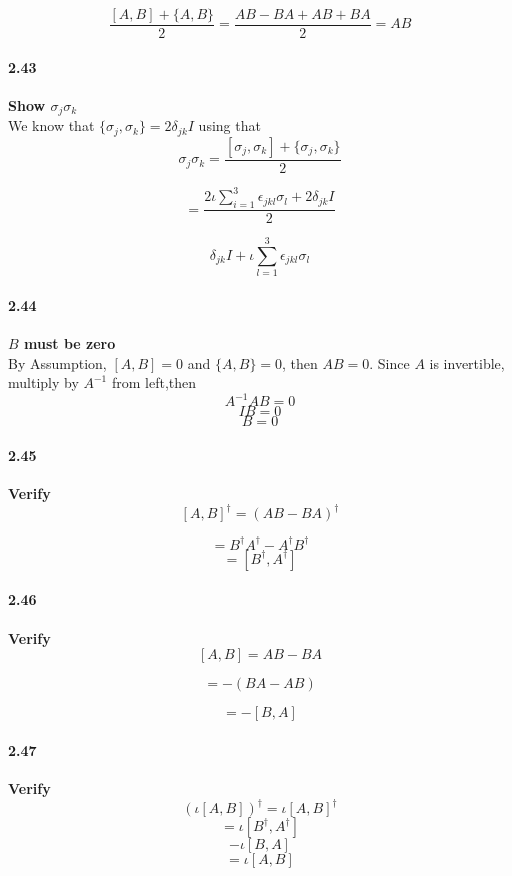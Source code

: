 $$\frac{[A,B] + \{A,B\}}{2} = \frac{AB - BA + AB + BA}{2} = AB$$



 \paragraph{2.43} \textbf{Show $\sigma_j \sigma_k$} \\%

We know that $\{\sigma_j, \sigma_k\} = 2 \delta_{jk}I$
using that
$$ \sigma_j \sigma_k  = \frac{[\sigma_j, \sigma_k] + \{\sigma_j, \sigma_k\}}{2}$$

$$ = \frac{2 \iota \sum_{i=1}^3 \epsilon_{jkl} \sigma_l + 2 \delta_{jk}I}{2}$$

$$ \delta_{jk}I + \iota \sum_{l=1}^3 \epsilon_{jkl} \sigma_l$$



 \paragraph{2.44} \textbf{$B$ must be zero} \\%

By Assumption, $[A,B] = 0$ and $\{A,B\} = 0$, then $AB =0$. Since $A$ is invertible, multiply by $A^{-1}$ from left,then
$$ A^{-1}AB = 0$$
$$ I B = 0$$
$$ B = 0$$


 \paragraph{2.45} \textbf{Verify} \\%

$$[A, B]^{\dagger} = (AB - BA)^{\dagger}$$

$$ = B^{\dagger} A^{\dagger} - A^{\dagger}B^{\dagger}$$
$$ = [B^{\dagger}, A^{\dagger}]$$

 \paragraph{2.46} \textbf{Verify} \\%
$$ [A,B] = AB - BA$$

$$ = -(BA - AB)$$

$$ = -[B,A]$$

 \paragraph{2.47} \textbf{Verify} \\%
 $$ (\iota[A,B])^{\dagger} = \iota[A,B]^{\dagger}$$
 $$ = \iota [B^{\dagger}, A^{\dagger}]$$
 $$ - \iota [B, A]$$
 $$ = \iota [A,B]$$


 